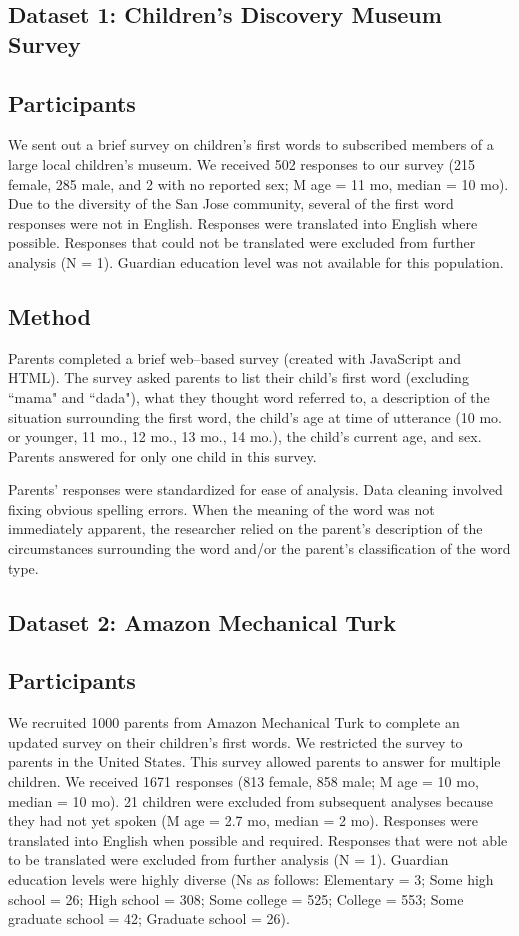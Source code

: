 \documentclass[10pt,letterpaper]{article}
\begin{document}
\subsection{Dataset 1: Children's Discovery Museum Survey}

\subsection{Participants}
We sent out a brief survey on children's first words to subscribed members of a large local children's museum. We received 502 responses to our survey (215 female, 285 male, and 2 with no reported sex; M age = 11 mo, median = 10 mo). Due to the diversity of the San Jose community, several of the first word responses were not in English. Responses were translated into English where possible. Responses that could not be translated were excluded from further analysis (N = 1). Guardian education level was not available for this population.

\subsection{Method}
Parents completed a brief web--based survey (created with JavaScript and HTML). The survey asked parents to list their child's first word (excluding ``mama" and ``dada"), what they thought word referred to, a description of the situation surrounding the first word, the child's age at time of utterance (10 mo. or younger, 11 mo., 12 mo., 13 mo., 14 mo.), the child's current age, and sex. Parents answered for only one child in this survey.

Parents' responses were standardized for ease of analysis. Data cleaning involved fixing obvious spelling errors. When the meaning of the word was not immediately apparent, the researcher relied on the parent's description of the circumstances surrounding the word and/or the parent's classification of the word type.


\subsection{Dataset 2: Amazon Mechanical Turk}

\subsection{Participants}
We recruited 1000 parents from Amazon Mechanical Turk to complete an updated survey on their children's first words. We restricted the survey to parents in the United States. This survey allowed parents to answer for multiple children. We received 1671 responses (813 female, 858 male; M age = 10 mo, median = 10 mo). 21 children were excluded from subsequent analyses because they had not yet spoken (M age = 2.7 mo, median = 2 mo). Responses were translated into English when possible and required. Responses that were not able to be translated were excluded from further analysis (N = 1). Guardian education levels were highly diverse (Ns as follows: Elementary = 3; Some high school = 26; High school = 308; Some college = 525; College = 553; Some graduate school = 42; Graduate school = 26). 
\end{document}
